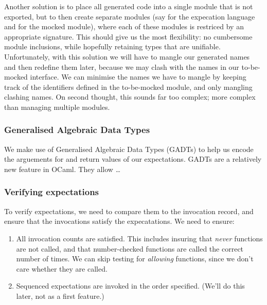 Another solution is to place all generated code into a single module
that is not exported, but to then create separate modules (say
 for the expecation language and  for the mocked
module), where each of these modules is restriced by an appropriate
signature. This should give us the most flexibility: no cumbersome
module inclusions, while hopefully retaining types that are
unifiable. Unfortunately, with this solution we will have to mangle
our generated names and then redefine them later, because we may clash
with the names in our to-be-mocked interface. We can minimise the
names we have to mangle by keeping track of the identifiers defined in
the to-be-mocked module, and only mangling clashing names. On second
thought, this sounds far too complex; more complex than managing
multiple modules.

\subsubsection{Generalised Algebraic Data Types}
\label{application:gadt}

We make use of Generalised Algebraic Data Types (GADTs) to help us
encode the arguements for and return values of our expectations. GADTs
are a relatively new feature in OCaml. They allow \dots


\subsubsection{Verifying expectations}

To verify expectations, we need to compare them to the invocation
record, and ensure that the invocations satisfy the expecatations. We
need to ensure:

\begin{enumerate}
\item All invocation counts are satisfied. This includes insuring that
  \textit{never} functions are not called, and that number-checked
  functions are called the correct number of times. We can skip
  testing for \textit{allowing} functions, since we don't care whether
  they are called.
\item Sequenced expectations are invoked in the order
  specified. (We'll do this later, not as a first feature.)
\end{enumerate}

